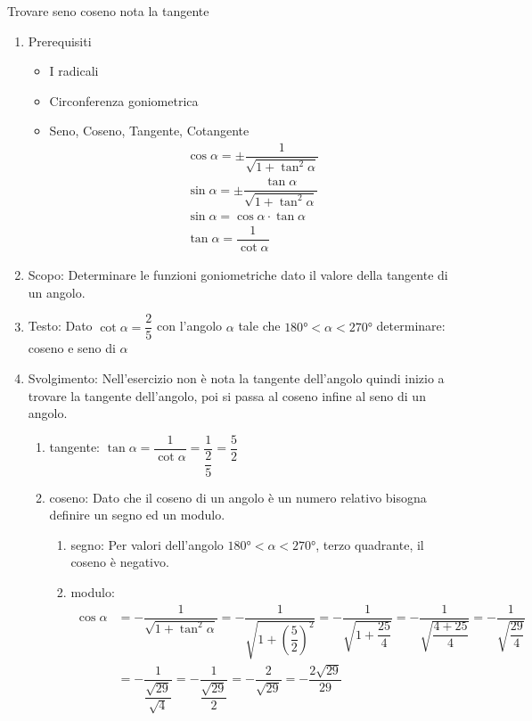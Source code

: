 \begin{table}[H]
	\caption{Trovare seno coseno nota la tangente}
	\label{tab:sommadifangoli}
	\begin{enumerate}
		\item Prerequisiti 
		\begin{itemize}
			\item I radicali
			\item Circonferenza goniometrica
			\item Seno, Coseno, Tangente, Cotangente
			\begin {align*}
			\cos\alpha=\pm\dfrac{1}{\sqrt{1+\tan^2\alpha}}\\
			\sin\alpha=\pm\dfrac{\tan\alpha}{\sqrt{1+\tan^2\alpha}}\\
			\sin\alpha=\cos\alpha\cdot\tan\alpha\\
			\tan\alpha=\dfrac{1}{\cot\alpha}
		\end{align*}
	\end{itemize}
	\item Scopo: Determinare le funzioni goniometriche dato il valore della tangente di un angolo.
	\item Testo: Dato $\cot\alpha=\dfrac{2}{5}$ con l'angolo $\alpha$ tale che $\ang{180}<\alpha<\ang{270}$ determinare: coseno e seno di $\alpha$
	\item Svolgimento: Nell'esercizio non è nota la tangente dell'angolo quindi inizio a trovare la tangente dell'angolo, poi si passa al coseno infine al seno di un angolo.
	\begin{enumerate}
		\item tangente: $\tan\alpha=\dfrac{1}{\cot\alpha}=\dfrac{1}{\dfrac{2}{5}}=\dfrac{5}{2}$
		\item coseno: Dato che il coseno di un angolo è un numero relativo bisogna definire un segno ed un modulo.
		\begin{enumerate}
			\item segno: Per valori dell'angolo  $\ang{180}<\alpha<\ang{270}$, terzo quadrante, il coseno è negativo. 
			\item modulo:
			\begin{align*}
			\cos\alpha&=-\dfrac{1}{\sqrt{1+\tan^2\alpha}}
			=-\dfrac{1}{\sqrt{1+\left(\dfrac{5}{2}\right)^2}}=-\dfrac{1}{\sqrt{1+\dfrac{25}{4}}}
			=-\dfrac{1}{\sqrt{\dfrac{4+25}{4}}}=-\dfrac{1}{\sqrt{\dfrac{29}{4}}}\\
			&=-\dfrac{1}{\dfrac{\sqrt{29}}{\sqrt{4}}}=-\dfrac{1}{\dfrac{\sqrt{29}}{2}}=-\dfrac{2}{\sqrt{29}}=-\dfrac{2\sqrt{29}}{29}
			\end{align*}

\end{enumerate}
\end{enumerate}
\end{enumerate}
\end{table}
